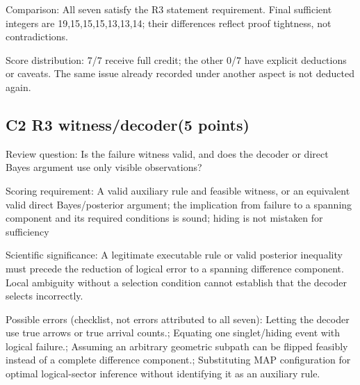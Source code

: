 \documentclass[11pt,a4paper]{article}
\begin{document}
Comparison: All seven satisfy the R3 statement requirement. Final sufficient integers are 19,\allowbreak{}15,\allowbreak{}15,\allowbreak{}15,\allowbreak{}13,\allowbreak{}13,\allowbreak{}14; their differences reflect proof tightness,\allowbreak{} not contradictions.

Score distribution: 7/\allowbreak{}7 receive full credit; the other 0/\allowbreak{}7 have explicit deductions or caveats. The same issue already recorded under another aspect is not deducted again.

\clearpage
\subsection{C2 R3 witness/\allowbreak{}decoder(5 points)}
\label{aspect:C2}
Review question: Is the failure witness valid,\allowbreak{} and does the decoder or direct Bayes argument use only visible observations?

Scoring requirement: A valid auxiliary rule and feasible witness,\allowbreak{} or an equivalent valid direct Bayes/\allowbreak{}posterior argument; the implication from failure to a spanning component and its required conditions is sound; hiding is not mistaken for sufficiency

Scientific significance: A legitimate executable rule or valid posterior inequality must precede the reduction of logical error to a spanning difference component. Local ambiguity without a selection condition cannot establish that the decoder selects incorrectly.

Possible errors (checklist,\allowbreak{} not errors attributed to all seven): Letting the decoder use true arrows or true arrival counts.; Equating one singlet/\allowbreak{}hiding event with logical failure.; Assuming an arbitrary geometric subpath can be flipped feasibly instead of a complete difference component.; Substituting MAP configuration for optimal logical-sector inference without identifying it as an auxiliary rule.
\end{document}
